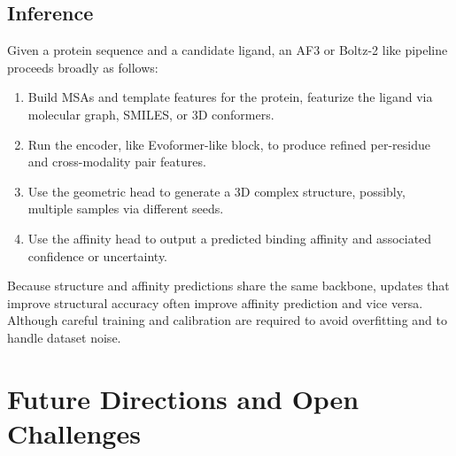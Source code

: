 \documentclass[12pt]{article}
\begin{document}
\subsection{Inference}

Given a protein sequence and a candidate ligand, an AF3 or Boltz-2 like pipeline proceeds broadly as follows:\cite{CH13_proteinpredictionuntilcasp15,CH13_passaro2025boltz2}
\begin{enumerate}
  \item Build MSAs and template features for the protein, featurize the ligand via molecular graph, SMILES, or 3D conformers.
  \item Run the encoder, like Evoformer-like block, to produce refined per-residue and cross-modality pair features.
  \item Use the geometric head to generate a 3D complex structure, possibly, multiple samples via different seeds.
  \item Use the affinity head to output a predicted binding affinity and associated confidence or uncertainty.
\end{enumerate}
Because structure and affinity predictions share the same backbone, updates that improve structural accuracy often improve affinity prediction and vice versa. Although careful training and calibration are required to avoid overfitting and to handle dataset noise.\cite{CH13_passaro2025boltz2,CH13_wan2026reliability}

\section{Future Directions and Open Challenges}
\end{document}
